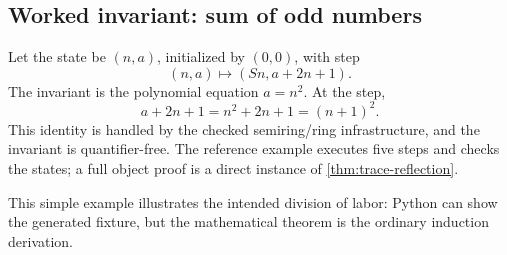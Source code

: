 \subsection{Worked invariant: sum of odd numbers}

Let the state be \((n,a)\), initialized by \((0,0)\), with step
\[
  (n,a)\longmapsto(Sn,a+2n+1).
\]
The invariant is the polynomial equation \(a=n^2\).  At the step,
\[
  a+2n+1=n^2+2n+1=(n+1)^2.
\]
This identity is handled by the checked semiring/ring infrastructure, and the
invariant is quantifier-free.  The reference example executes five steps and
checks the states; a full object proof is a direct instance of
\cref{thm:trace-reflection}.

This simple example illustrates the intended division of labor: Python can
show the generated fixture, but the mathematical theorem is the ordinary
induction derivation.
